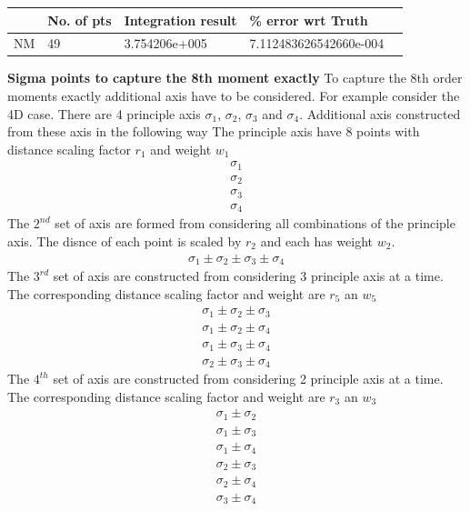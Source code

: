 \documentclass{article}
\begin{document}
\begin{center}
  \begin{tabular}{ | l | l | l | l | l | }
    \hline
                  					&   No. of pts			& Integration result 			  & \% error wrt Truth			 \\ \hline 
      NM          					&   49       			  & 3.754206e+005          & 7.112483626542660e-004   \\
      \hline
  \end{tabular}
\end{center}
{\bf Sigma points to capture the 8th moment exactly }
To capture the 8th order moments exactly additional axis have to be considered. For example consider the 4D case. There are 4 principle axis $\sigma_1$, $\sigma_2$, $\sigma_3$ and $\sigma_4$. Additional axis constructed from these axis in the following way\newline\newline
The principle axis have 8 points with distance scaling factor $r_1$ and weight $w_1$
 \begin{align}
 \sigma_1 \nonumber \\
 \sigma_2 \nonumber \\
 \sigma_3 \nonumber \\
 \sigma_4
 \end{align}
The $2^{nd}$ set of axis are formed from considering all combinations of the principle axis. The disnce of each point is scaled by $r_2$ and each has weight $w_2$.
\begin{align}
\sigma_1 \pm \sigma_2 \pm \sigma_3 \pm \sigma_4
\end{align}
The $3^{rd}$ set of axis are constructed from considering 3 principle axis at a time. The corresponding distance scaling factor and weight are $r_5$ an $w_5$
\begin{align}
\sigma_1 \pm \sigma_2 \pm \sigma_3 \nonumber \\
\sigma_1 \pm \sigma_2 \pm \sigma_4 \nonumber \\
\sigma_1 \pm \sigma_3 \pm \sigma_4 \nonumber \\
\sigma_2 \pm \sigma_3 \pm \sigma_4 
\end{align}
The $4^{th}$ set of axis are constructed from considering 2 principle axis at a time. The corresponding distance scaling factor and weight are $r_3$ an $w_3$
\begin{align}
\sigma_1 \pm \sigma_2 \nonumber \\
\sigma_1 \pm \sigma_3 \nonumber \\
\sigma_1 \pm \sigma_4 \nonumber \\
\sigma_2 \pm \sigma_3 \nonumber \\
\sigma_2 \pm \sigma_4 \nonumber \\
\sigma_3 \pm \sigma_4 \nonumber 
\end{align}
\end{document}
